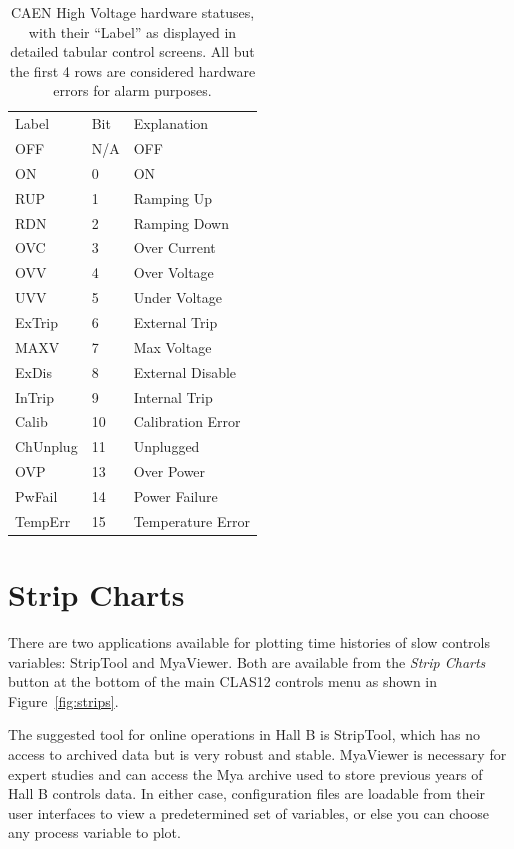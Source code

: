 \documentclass[amsmath,amssymb,notitlepage,11pt]{revtex4}
\begin{document}
\begin{table}[htpb]\centering
  \begin{tabular}{lll}  \toprule[1.5pt]
    Label    & Bit & Explanation \\ \cmidrule[0.5pt]{1-3}
    OFF      & N/A & OFF\\
    ON       & 0 & ON\\
    RUP      & 1 & Ramping Up\\
    RDN      & 2 & Ramping Down\\
    OVC      & 3 & Over Current\\
    OVV      & 4 & Over Voltage\\
    UVV      & 5 & Under Voltage\\
    ExTrip   & 6 & External Trip\\
    MAXV     & 7 & Max Voltage\\
    ExDis    & 8 & External Disable\\
    InTrip   & 9 & Internal Trip\\
    Calib    & 10 & Calibration Error\\
    ChUnplug & 11 & Unplugged\\
    OVP      & 13 & Over Power\\
    PwFail   & 14 & Power Failure\\
    TempErr  & 15 & Temperature Error\\
    \bottomrule[1.5pt]
  \end{tabular}
  \caption{CAEN High Voltage hardware statuses, with their ``Label'' as displayed in detailed tabular control screens.  All but the first 4 rows are considered hardware errors for alarm purposes.\label{tab:hvstat}}  
\end{table}

\clearpage

\section{Strip Charts}
There are two applications available for plotting time histories of slow controls variables:  StripTool and MyaViewer.  Both are available from the {\em Strip Charts} button at the bottom of the main CLAS12 controls menu as shown in Figure~\ref{fig:strips}.

The suggested tool for online operations in Hall B is StripTool, which has no access to archived data but is very robust and stable.  MyaViewer is necessary for expert studies and can access the Mya archive used to store previous years of Hall B controls data.  In either case, configuration files are loadable from their user interfaces to view a predetermined set of variables, or else you can choose any process variable to plot.
\end{document}

